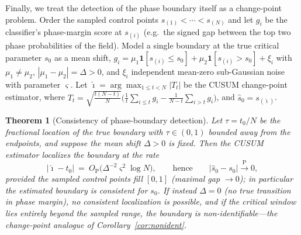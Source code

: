 \documentclass[aps,prresearch,reprint,amsmath,amssymb,nofootinbib,superscriptaddress,floatfix]{revtex4-2}
\newtheorem{theorem}{Theorem}
\theoremstyle{definition}
\theoremstyle{remark}
\theoremstyle{plain}
\begin{document}
Finally, we treat the detection of the phase boundary itself as a change-point problem. Order the sampled
control points $s_{(1)}<\cdots<s_{(N)}$ and let $g_i$ be the classifier's phase-margin score at $s_{(i)}$
(e.g.\ the signed gap between the top two phase probabilities of the field). Model a single boundary at the
true critical parameter $s_0$ as a mean shift, $g_i=\mu_1\mathbf 1[s_{(i)}\le s_0]+\mu_2\mathbf
1[s_{(i)}>s_0]+\xi_i$ with $\mu_1\neq\mu_2$, $|\mu_1-\mu_2|=\Delta>0$, and $\xi_i$ independent mean-zero
sub-Gaussian noise with parameter $\varsigma$. Let $\widehat\imath=\arg\max_{1\le t<N}|T_t|$ be the CUSUM
change-point estimator, where
$T_t=\sqrt{\tfrac{t(N-t)}{N}}\big(\tfrac1t\sum_{i\le t}g_i-\tfrac1{N-t}\sum_{i>t}g_i\big)$, and
$\widehat s_0=s_{(\widehat\imath)}$.

\begin{theorem}[Consistency of phase-boundary detection]
\label{thm:changepoint}
Let $\tau=t_0/N$ be the fractional location of the true boundary with $\tau\in(0,1)$ bounded away from the
endpoints, and suppose the mean shift $\Delta>0$ is fixed. Then the CUSUM estimator localizes the boundary
at the rate
\begin{equation}
\big|\widehat\imath-t_0\big|\ =\ O_{\mathrm P}\!\big(\Delta^{-2}\varsigma^2\log N\big),
\qquad\text{hence}\qquad \big|\widehat s_0-s_0\big|\xrightarrow{\ \mathrm P\ }0,
\label{eq:cp-rate}
\end{equation}
provided the sampled control points fill $[0,1]$ (maximal gap $\to0$); in particular the estimated boundary
is consistent for $s_0$. If instead $\Delta=0$ (no true transition in phase margin), no consistent
localization is possible, and if the critical window lies entirely beyond the sampled range, the boundary is
non-identifiable---the change-point analogue of Corollary~\ref{cor:nonident}.
\end{theorem}
\end{document}
